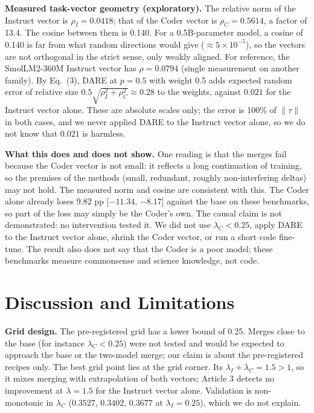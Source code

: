 \documentclass[conference]{IEEEtran}
\begin{document}
\textbf{Measured task-vector geometry (exploratory).} The relative norm of the Instruct vector is $\rho_I=0.0418$; that of the Coder vector is $\rho_C=0.5614$, a factor of 13.4. The cosine between them is 0.140. For a 0.5B-parameter model, a cosine of 0.140 is far from what random directions would give ($\approx 5\times10^{-5}$), so the vectors are not orthogonal in the strict sense, only weakly aligned. For reference, the SmolLM2-360M Instruct vector has $\rho=0.0794$ (single measurement on another family). By Eq.~(3), DARE at $p=0.5$ with weight 0.5 adds expected random error of relative size $0.5\sqrt{\rho_I^2+\rho_C^2}\approx0.28$ to the weights, against $0.021$ for the Instruct vector alone. These are absolute scales only; the error is 100\% of $\lVert\tau\rVert$ in both cases, and we never applied DARE to the Instruct vector alone, so we do not know that $0.021$ is harmless.

\textbf{What this does and does not show.} One reading is that the merges fail because the Coder vector is not small: it reflects a long continuation of training, so the premises of the methods (small, redundant, roughly non-interfering deltas) may not hold. The measured norm and cosine are consistent with this. The Coder alone already loses 9.82 pp [$-11.34$, $-8.17$] against the base on these benchmarks, so part of the loss may simply be the Coder's own. The causal claim is not demonstrated: no intervention tested it. We did not use $\lambda_C<0.25$, apply DARE to the Instruct vector alone, shrink the Coder vector, or run a short code fine-tune. The result also does not say that the Coder is a poor model; these benchmarks measure commonsense and science knowledge, not code.

\section{Discussion and Limitations}
\textbf{Grid design.} The pre-registered grid has a lower bound of 0.25. Merges close to the base (for instance $\lambda_C<0.25$) were not tested and would be expected to approach the base or the two-model merge; our claim is about the pre-registered recipes only. The best grid point lies at the grid corner. Its $\lambda_I+\lambda_C=1.5>1$, so it mixes merging with extrapolation of both vectors; Article 3 detects no improvement at $\lambda=1.5$ for the Instruct vector alone. Validation is non-monotonic in $\lambda_C$ ($0.3527$, $0.3402$, $0.3677$ at $\lambda_I=0.25$), which we do not explain.
\end{document}
